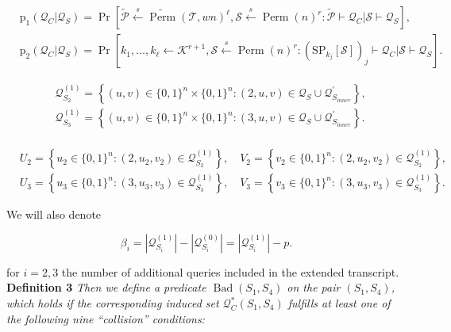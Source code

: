 $$
\begin{aligned}
&\mathrm{p}_{1}\left(\mathcal{Q}_{C} | \mathcal{Q}_{S}\right)=\operatorname{Pr}\left[\widetilde{\mathcal{P}} \stackrel{s}{\leftarrow} \widetilde{\operatorname{Perm}}(\mathcal{T}, w n)^{\ell}, \mathcal{S} \stackrel{s}{\leftarrow} \operatorname{Perm}(n)^{r}: \tilde{\mathcal{P}} \vdash \mathcal{Q}_{C} | \mathcal{S} \vdash \mathcal{Q}_{S}\right],\\
&\mathrm{p}_{2}\left(\mathcal{Q}_{C} | \mathcal{Q}_{S}\right)=\operatorname{Pr}\left[k_{1}, \ldots, k_{\ell} \leftarrow \mathcal{K}^{r+1}, \mathcal{S} \stackrel{s}{\leftarrow} \operatorname{Perm}(n)^{r}:\left(\mathrm{SP}_{k_{j}}[\mathcal{S}]\right)_{j} \vdash \mathcal{Q}_{C} | \mathcal{S} \vdash \mathcal{Q}_{S}\right].
\end{aligned}
$$

$$
\begin{aligned}
&\mathcal{Q}_{S_{2}}^{(1)}=\left\{(u, v) \in\{0,1\}^{n} \times\{0,1\}^{n}:(2, u, v) \in \mathcal{Q}_{S} \cup \mathcal{Q}_{S_{inner}}^{\prime}\right\},\\
&\mathcal{Q}_{S_{3}}^{(1)}=\left\{(u, v) \in\{0,1\}^{n} \times\{0,1\}^{n}:(3, u, v) \in \mathcal{Q}_{S} \cup \mathcal{Q}_{S_{inner}}^{\prime}\right\}.\\
\end{aligned}
$$

$$
\begin{aligned}
&U_{2}=\left\{u_{2} \in\{0,1\}^{n}:\left(2, u_{2}, v_{2}\right) \in \mathcal{Q}_{S_{2}}^{(1)}\right\}, \quad V_{2}=\left\{v_{2} \in\{0,1\}^{n}:\left(2, u_{2}, v_{2}\right) \in \mathcal{Q}_{S_{2}}^{(1)}\right\},\\
&U_{3}=\left\{u_{3} \in\{0,1\}^{n}:\left(3, u_{3}, v_{3}\right) \in \mathcal{Q}_{S_{3}}^{(1)}\right\}, \quad V_{3}=\left\{v_{3} \in\{0,1\}^{n}:\left(3, u_{3}, v_{3}\right) \in \mathcal{Q}_{S_{3}}^{(1)}\right\}.
\end{aligned}
$$

We will also denote

$$
\beta_{i}=\left|\mathcal{Q}_{S_{i}}^{(1)}\right|-\left|\mathcal{Q}_{S_{i}}^{(0)}\right|=\left|\mathcal{Q}_{S_{i}}^{(1)}\right|-p.
$$

for $i=2, 3$ the number of additional queries included in the extended transcript.\\

\noindent \textbf{Definition 3} \emph{Then we define a predicate $\operatorname{Bad}\left(S_{1},S_{4}\right)$ on the pair $(S_1, S_4)$, which holds if the corresponding induced set $\mathcal{Q}_{C}^{*}\left(S_{1}, S_{4}\right)$ fulfills at least one of the following nine ``collision'' conditions:}

